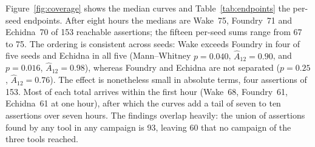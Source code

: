 \documentclass[11pt,a4paper]{article}
\newcommand{\wake}{Wake}
\begin{document}
Figure~\ref{fig:coverage} shows the median curves and Table~\ref{tab:endpoints} the per-seed endpoints. After eight hours the medians are \wake{}~75, Foundry~71 and Echidna~70 of 153 reachable assertions; the fifteen per-seed sums range from 67 to 75. The ordering is consistent across seeds: \wake{} exceeds Foundry in four of five seeds and Echidna in all five (Mann--Whitney $p=0.040$, $\hat{A}_{12}=0.90$, and $p=0.016$, $\hat{A}_{12}=0.98$), whereas Foundry and Echidna are not separated ($p=0.25$, $\hat{A}_{12}=0.76$). The effect is nonetheless small in absolute terms, four assertions of 153. Most of each total arrives within the first hour (\wake{}~68, Foundry~61, Echidna~61 at one hour), after which the curves add a tail of seven to ten assertions over seven hours. The findings overlap heavily: the union of assertions found by any tool in any campaign is 93, leaving 60 that no campaign of the three tools reached.
\end{document}
